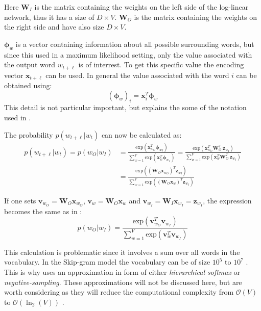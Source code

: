 Here $\mathbf{W}_I$ is the matrix containing the weights on the left side of the log-linear network, thus it has a size of $D \times V$. $\mathbf{W}_O$ is the matrix containing the weights on the right side and have also size $D \times V$.

$\boldsymbol\phi_w$ is a vector containing information about all possible surrounding words, but since this used in a maximum likelihood setting, only the value associated with the output word $w_{t + \ell}$ is of interrest. To get this specific value the encoding vector $\mathbf{x}_{t + \ell}$ can be used. In general the value associated with the word $i$ can be obtained using: \begin{equation}
\left(\boldsymbol\phi_w\right)_i = \mathbf{x}_{i}^T \boldsymbol\phi_w
\end{equation}
This detail is not particular important, but explains the some of the notation used in \cite{word2vec-details}.

The probability $p(w_{t + \ell} | w_t)$ can now be calculated as:
\begin{equation}
\begin{aligned}
p(w_{t + \ell} | w_t) = p(w_O | w_I) &= \frac{
	\mathrm{exp}(\mathbf{x}^T_{w_O} \boldsymbol\phi_{w_I} )
}{
	\sum_{w=1}^V \mathrm{exp}(\mathbf{x}^T_{w} \boldsymbol\phi_{w_I})
} = \frac{
	\mathrm{exp}(\mathbf{x}^T_{w_O} \mathbf{W}_O^T\ \mathbf{z}_{w_I} )
}{
	\sum_{w=1}^V \mathrm{exp}(\mathbf{x}^T_{w} \mathbf{W}_O^T\ \mathbf{z}_{w_I})
}
\\
&= \frac{
	\mathrm{exp}( \left( \mathbf{W}_O \mathbf{x}_{w_O} \right)^T \mathbf{z}_{w_I} )
}{
	\sum_{w=1}^V \mathrm{exp}( \left( \mathbf{W}_O \mathbf{x}_{w} \right)^T \mathbf{z}_{w_I})
}
\end{aligned}
\end{equation}

If one sets $\mathbf{v}_{w_O} = \mathbf{W}_O \mathbf{x}_{w_O}$, $\mathbf{v}_{w} = \mathbf{W}_O \mathbf{x}_{w}$  and $\mathbf{v}_{w_I} =  \mathbf{W}_I \mathbf{x}_{w_I} = \mathbf{z}_{w_I}$, the expression becomes the same as in \cite[eq. 2]{word2vec-details}: 
\begin{equation}
p(w_O | w_I) = \frac{
	\mathrm{exp}( \mathbf{v}_{w_O}^T \mathbf{v}_{w_I} )
}{
	\sum_{w=1}^V \mathrm{exp}( \mathbf{v}_{w}^T \mathbf{v}_{w_I} )
}
\end{equation}

This calculation is problematic since it involves a sum over all words in the vocabulary. In the Skip-gram model the vocabulary can be of size $10^5$ to $10^7$ \cite{word2vec-details}. This is why \cite{word2vec-comparing, word2vec-details, word2vec-explained} uses an approximation in form of either \textit{hierarchical softmax} or \textit{negative-sampling}. These approximations will not be discussed here, but are worth considering as they will reduce the computational complexity from $\mathcal{O}(V)$ to $\mathcal{O}(\ln_2(V))$ \cite{word2vec-comparing}.

